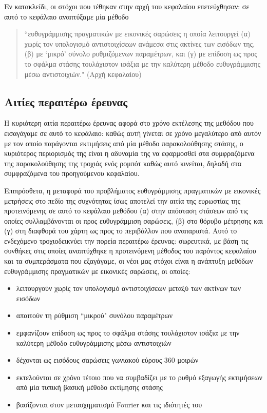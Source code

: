 Εν κατακλείδι, οι στόχοι που τέθηκαν στην αρχή του κεφαλαίου επετεύχθησαν:
σε αυτό το κεφάλαιο αναπτύξαμε μία μέθοδο

\begin{quote}
``ευθυγράμμισης πραγματικών με εικονικές σαρώσεις η οποία λειτουργεί (α) χωρίς
τον υπολογισμό αντιστοιχίσεων ανάμεσα στις ακτίνες των εισόδων της, (β) με
`μικρό' σύνολο ρυθμιζόμενων παραμέτρων, και (γ) με επίδοση ως προς το σφάλμα
στάσης τουλάχιστον ισάξια με την καλύτερη μέθοδο ευθυγράμμισης μέσω
αντιστοιχιών." (Αρχή κεφαλαίου)
\end{quote}


\subsection{Αιτίες περαιτέρω έρευνας}
\label{subsection:02_03_05:02}

Η κυριότερη αιτία περαιτέρω έρευνας αφορά στο χρόνο εκτέλεσης της μεθόδου που
εισαγάγαμε σε αυτό το κεφάλαιο: καθώς αυτή γίνεται σε χρόνο μεγαλύτερο από
αυτόν με τον οποίο παράγονται εκτιμήσεις από μία μέθοδο παρακολούθησης στάσης,
ο κυριότερος περιορισμός της είναι η αδυναμία της να εφαρμοσθεί στα
συμφραζόμενα της παρακολούθησης της τροχιάς ενός ρομπότ καθώς αυτό κινείται,
δηλαδή στα συμφραζόμενα του προηγούμενου κεφαλαίου.

Επιπρόσθετα, η μεταφορά του προβλήματος ευθυγράμμισης πραγματικών με εικονικές
μετρήσεις στο πεδίο της συχνότητας ίσως αποτελεί την αιτία της ευρωστίας της
προτεινόμενης σε αυτό το κεφάλαιο μεθόδου (α) στην απόσταση στάσεων από τις
οποίες συλλαμβάνονται οι προς ευθυγράμμιση σαρώσεις, (β) στο θόρυβο μέτρησης
και (γ) στη διαφθορά του χάρτη ως προς το περιβάλλον που αναπαριστά.  Αυτό το
ενδεχόμενο τροχιοδεικνύει την πορεία περαιτέρω έρευνας: σωρευτικά, με βάση τις
συνθήκες στις οποίες αναπτύχθηκε η προτεινόμενη μέθοδος του παρόντος κεφαλαίου
και τα συμπεράσματα που εξαγάγαμε, οι νέοι μας στόχοι είναι η ανάπτυξη μεθόδων
ευθυγράμμισης πραγματικών με εικονικές σαρώσεις, οι οποίες:

\begin{itemize}
  \item λειτουργούν χωρίς τον υπολογισμό αντιστοιχίσεων μεταξύ των ακτίνων των
        εισόδων
  \item απαιτούν τη ρύθμιση ``μικρού" συνόλου παραμέτρων
  \item εμφανίζουν επίδοση ως προς το σφάλμα στάσης τουλάχιστον ισάξια με την
        καλύτερη μέθοδο ευθυγράμμισης μέσω αντιστοιχιών
  \item δέχονται ως εισόδους σαρώσεις γωνιακού εύρους $360$ μοιρών
  \item εκτελούνται σε χρόνο τέτοιο που να συμβαδίζει με το ρυθμό
        εξαγωγής εκτιμήσεων από μία τυπική βασική μέθοδο εκτίμησης στάσης
  \item βασίζονται στον μετασχηματισμό Fourier και τις ιδιότητές του
\end{itemize}
